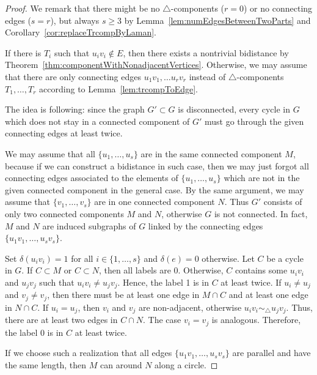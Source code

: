 \documentclass[a4paper, 11pt]{article}
\newcommand{\trcomps}{$\triangle$-components}
\theoremstyle{definition}
\begin{document}
\begin{proof}
We remark that there might be no \trcomps{} ($r=0$) or no connecting edges ($s=r$), but always $s\geq 3$ by Lemma~\ref{lem:numEdgesBetweenTwoParts} and Corollary~\ref{cor:replaceTrcompByLaman}.

If there is $T_i$ such that $u_i v_i \notin E$, then there exists a nontrivial bidistance by Theorem~\ref{thm:componentWithNonadjacentVertices}.
Otherwise, we may assume that there are only connecting edges  $u_1 v_1, \dots u_r v_r$ instead of \trcomps{} $T_1, \dots, T_r$ according to Lemma~\ref{lem:trcompToEdge}.

The idea is following: since the graph $G'\subset G$ is disconnected, every cycle in $G$ which does not stay in a connected component of $G'$ must go through the given  connecting edges at least twice.

We may assume that all $\{u_1, \dots, u_s\}$ are in the same connected component $M$, because if we can construct a bidistance in such case, then we may just forgot all connecting edges associated to the elements of $\{u_1, \dots, u_s\}$ which are not in the given connected component in the general case. By the same argument, we may assume that $\{v_1, \dots, v_s\}$ are in one connected component $N$. Thus $G'$ consists of only two connected components $M$ and $N$, otherwise $G$ is not connected. In fact, $M$ and $N$ are induced subgraphs of $G$ linked by the connecting edges $\{u_1v_1, \dots, u_sv_s\}$.

Set $\delta(u_i v_i)=1$ for all $i\in \{1, \dots, s\}$ and $\delta(e)=0$ otherwise. Let $C$ be a cycle in $G$. If $C\subset M$ or  $C\subset N$, then all labels are 0. Otherwise, $C$ contains some $u_iv_i$ and $u_jv_j$ such that $u_iv_i\neq u_jv_j$. Hence, the label 1 is in $C$ at least twice. If $u_i\neq u_j$ and $v_j\neq v_j$, then there must be at least one edge in $M\cap C$ and at least one edge in $N\cap C$.  If $u_i=u_j$, then $v_i$ and $v_j$ are non-adjacent, otherwise $u_iv_i \sim_{\!\!\bigtriangleup} u_jv_j$. Thus, there are at least two edges in $C\cap N$. The case $v_i=v_j$ is analogous. Therefore, the label 0 is in $C$ at least twice.

If we choose such a realization that all edges $\{u_1v_1, \dots, u_sv_s\}$ are parallel and have the same length, then $M$ can around $N$ along a circle.
\end{proof}
\end{document}
